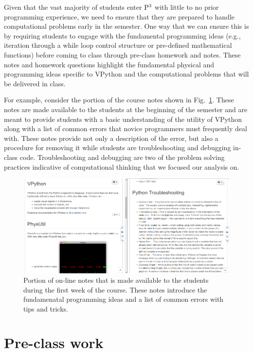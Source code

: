 \documentclass{msuphddissertation}
\begin{document}
\begin{doublespace}
Given that the vast majority of students enter ${\rm P}^{3}$ with little to no prior programming experience, we need to ensure that they are prepared to handle computational problems early in the semester.  One way that we can ensure this is by requiring students to engage with the fundamental programming ideas (e.g., iteration through a while loop control structure or pre-defined mathematical functions) before coming to class through pre-class homework and notes.  These notes and homework questions highlight the fundamental physical and programming ideas specific to VPython and the computational problems that will be delivered in class.

For example, consider the portion of the course notes shown in Fig.~\ref{CH3:VPythonNotes}.  These notes are made available to the students at the beginning of the semester and are meant to provide students with a basic understanding of the utility of VPython along with a list of common errors that novice programmers must frequently deal with.  These notes provide not only a description of the error, but also a procedure for removing it while students are troubleshooting and debugging in-class code.  Troubleshooting and debugging are two of the problem solving practices indicative of computational thinking that we focused our analysis on.

\begin{figure}[ht]\centering
\includegraphics[scale=1]{images/CH3VPythonNotes.pdf}
\caption{Portion of on-line notes that is made available to the students during the first week of the course.  These notes introduce the fundamenatal programming ideas and a list of common errors with tips and tricks.}\label{CH3:VPythonNotes}
\end{figure} 

\section{Pre-class work}


\end{doublespace}
\end{document}
